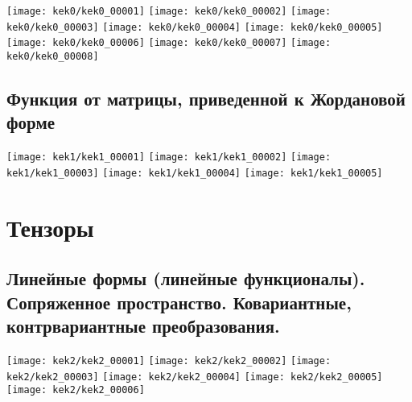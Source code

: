 \documentclass[../main.tex]{subfiles}
\begin{document}
	\texttt{[image: kek0/kek0\_00001]}
	\texttt{[image: kek0/kek0\_00002]}
	\texttt{[image: kek0/kek0\_00003]}
	\texttt{[image: kek0/kek0\_00004]}
	\texttt{[image: kek0/kek0\_00005]}
	\texttt{[image: kek0/kek0\_00006]}
	\texttt{[image: kek0/kek0\_00007]}
	\texttt{[image: kek0/kek0\_00008]}
	\subsection{Функция от матрицы, приведенной к Жордановой форме}
	\texttt{[image: kek1/kek1\_00001]}\n
	\texttt{[image: kek1/kek1\_00002]}
	\texttt{[image: kek1/kek1\_00003]}\n
	\texttt{[image: kek1/kek1\_00004]}\n
	\texttt{[image: kek1/kek1\_00005]}
	\section{Тензоры}
	\subsection{Линейные формы (линейные функционалы). Сопряженное пространство. Ковариантные, 
	контрвариантные преобразования.}
	\texttt{[image: kek2/kek2\_00001]}\n
	\texttt{[image: kek2/kek2\_00002]}
	\texttt{[image: kek2/kek2\_00003]}\n
	\texttt{[image: kek2/kek2\_00004]}\n
	\texttt{[image: kek2/kek2\_00005]}\n
	\texttt{[image: kek2/kek2\_00006]}
\end{document}
